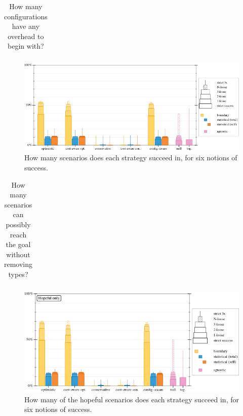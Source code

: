 \documentclass{article}
\begin{document}
\begin{table}[ht]\centering
  \caption{How many configurations have any overhead to begin with?}
  \label{t:baseline-trouble}
  \begin{tabular}{lrr}
    
  \end{tabular}
\end{table}

\begin{figure}[ht]
  \includegraphics[width=\columnwidth]{tex/strategy-overall-feasible.pdf}
  \caption{How many scenarios does each strategy succeed in, for six notions of success.}
  \label{f:strategy-overall}
\end{figure}

\begin{table}[ht]\centering
  \caption{How many scenarios can possibly reach the goal without removing types?}
  \label{t:blackhole}
  \begin{tabular}{lrr}
    
  \end{tabular}
\end{table}

\begin{figure}[ht]
  \includegraphics[width=\columnwidth]{tex/strategy-overall-hopeful.pdf}
  \caption{How many of the hopeful scenarios does each strategy succeed in, for six notions of success.}
  \label{f:strategy-hope}
\end{figure}
\end{document}
